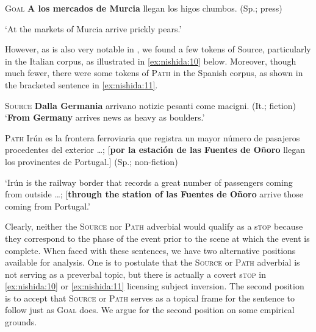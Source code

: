 \documentclass[output=paper,colorlinks,citecolor=brown,
]{langscibook}
\begin{document}
\begin{exe} %
    \ex\label{ex:nishida:9} 
\textsc{Goal} \quad \textbf{A los mercados de Murcia} llegan los higos chumbos. (Sp.; press)

 \glt `At the markets of Murcia arrive prickly pears.'\\
\end{exe}

However, as is also very notable in , we found a few tokens of Source, particularly in the Italian corpus, as illustrated in \ref{ex:nishida:10} below. Moreover, though much fewer, there were some tokens of \textsc{Path} in the Spanish corpus, as shown in the bracketed sentence in \ref{ex:nishida:11}. 

\begin{exe} %
    \ex\label{ex:nishida:10} 
 \textsc{Source} \quad	\textbf{Dalla Germania} arrivano notizie pesanti come macigni. 
 (It.; fiction)
\glt `\textbf{From Germany} arrives news as heavy as boulders.'
\end{exe}

\begin{exe} %
    \ex\label{ex:nishida:11} 
\textsc{Path} \quad  Irún es la frontera ferroviaria que registra un mayor número de pasajeros procedentes del exterior {\dots};
[\textbf{por la estación de las Fuentes de Oñoro} llegan los	provinentes de Portugal.] (Sp.; non-fiction)

 \glt `Irún is the railway border that records a great number of passengers coming from   outside {\dots}; [\textbf{through the station of las Fuentes de Oñoro} arrive those coming 	from Portugal.'\\
\end{exe}

Clearly, neither the \textsc{Source} nor \textsc{Path} adverbial would qualify as a s\textsc{top} because they correspond to the phase of the event prior to the scene at which the event is complete. When faced with these sentences, we have two alternative positions available for analysis. One is to postulate that the  \textsc{Source} or \textsc{Path} adverbial is not serving as a preverbal topic, but there is actually a covert s\textsc{top} in \ref{ex:nishida:10} or \ref{ex:nishida:11} licensing subject inversion. The second position is to accept that  \textsc{Source} or \textsc{Path}  serves as a topical frame for the sentence to follow just as \textsc{Goal} does. We argue for the second position on some empirical grounds. 
\end{document}

